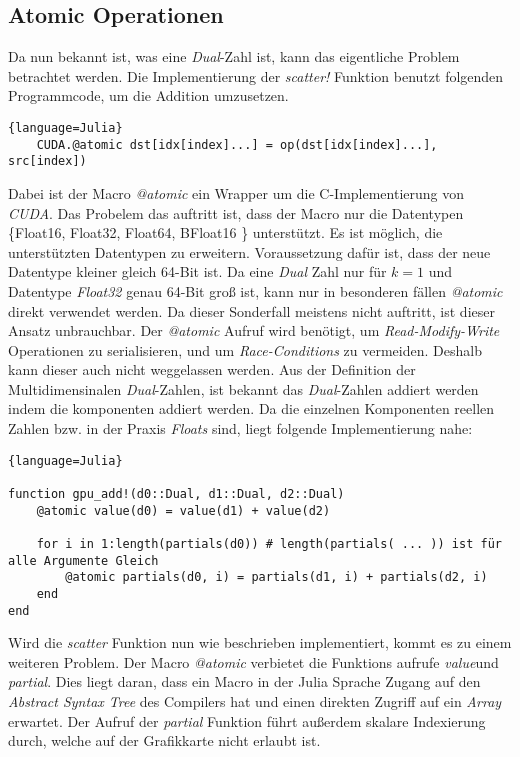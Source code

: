 \subsection{Atomic Operationen} \label{atomic}

Da nun bekannt ist, was eine \textit{Dual}-Zahl ist, 
kann das eigentliche Problem betrachtet werden.
Die Implementierung der \textit{scatter!} Funktion benutzt folgenden Programmcode, um die 
Addition umzusetzen.

\begin{lstlisting}{language=Julia}
	CUDA.@atomic dst[idx[index]...] = op(dst[idx[index]...], src[index])
\end{lstlisting}

Dabei ist der Macro \textit{@atomic} ein Wrapper um die C-Implementierung von \textit{CUDA}.
Das Probelem das auftritt ist, dass der Macro nur die Datentypen \{Float16, Float32, Float64, BFloat16 \}
unterstützt.
Es ist möglich, die unterstützten Datentypen zu erweitern.
Voraussetzung dafür ist, dass der neue Datentype kleiner gleich 64-Bit ist.
Da eine \textit{Dual} Zahl nur für $k = 1$ und Datentype \textit{Float32} genau 64-Bit groß ist,
kann nur in besonderen fällen \textit{@atomic} direkt verwendet werden.
Da dieser Sonderfall meistens nicht auftritt, ist dieser Ansatz unbrauchbar.
Der \textit{@atomic} Aufruf wird benötigt,
um \textit{Read-Modify-Write} Operationen zu serialisieren, 
und um \textit{Race-Conditions} zu vermeiden. 
Deshalb kann dieser auch nicht weggelassen werden.
Aus der Definition der Multidimensinalen \textit{Dual}-Zahlen, 
ist bekannt das \textit{Dual}-Zahlen addiert werden indem die komponenten addiert werden.
Da die einzelnen Komponenten reellen Zahlen 
bzw. in der Praxis \textit{Floats} sind, liegt folgende Implementierung nahe:

\begin{lstlisting}{language=Julia}

function gpu_add!(d0::Dual, d1::Dual, d2::Dual)
	@atomic value(d0) = value(d1) + value(d2)
	
	for i in 1:length(partials(d0)) # length(partials( ... )) ist für alle Argumente Gleich
		@atomic partials(d0, i) = partials(d1, i) + partials(d2, i)
	end
end

\end{lstlisting}

Wird die \textit{scatter} Funktion nun wie beschrieben implementiert, kommt es zu einem weiteren Problem.
Der Macro \textit{@atomic} verbietet die Funktions aufrufe \textit{value}und \textit{partial}.
Dies liegt daran, dass ein Macro in der Julia Sprache Zugang auf den \textit{Abstract Syntax Tree} des Compilers hat
und einen direkten Zugriff auf ein \textit{Array} erwartet.
Der Aufruf der \textit{partial} Funktion führt außerdem skalare Indexierung durch, welche auf der Grafikkarte nicht erlaubt ist.
